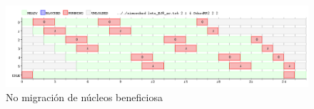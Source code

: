 \begin{figure}[!htb]
\begin{center}
  \includegraphics[scale=0.45]{imagenes/rr2-noconviene.png}
\end{center}
\caption{No migración de núcleos beneficiosa}\label{fig-nc2}
\end{figure}